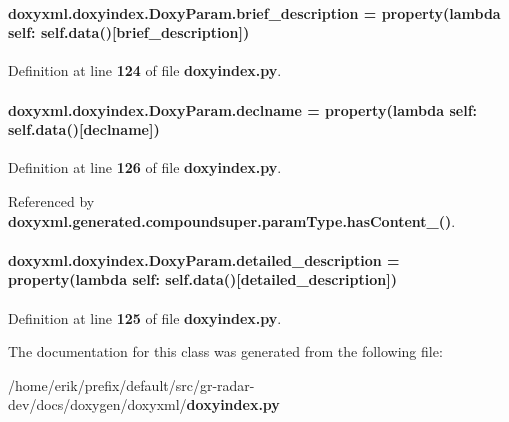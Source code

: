\paragraph[{brief\+\_\+description}]{\setlength{\rightskip}{0pt plus 5cm}doxyxml.\+doxyindex.\+Doxy\+Param.\+brief\+\_\+description = {\bf property}(lambda self\+: {\bf self.\+data}()[\textquotesingle{}brief\+\_\+description\textquotesingle{}])\hspace{0.3cm}{\ttfamily [static]}}\label{classdoxyxml_1_1doxyindex_1_1DoxyParam_ac78e5bace2788f436a82b792c61f61ea}


Definition at line {\bf 124} of file {\bf doxyindex.\+py}.

\paragraph[{declname}]{\setlength{\rightskip}{0pt plus 5cm}doxyxml.\+doxyindex.\+Doxy\+Param.\+declname = {\bf property}(lambda self\+: {\bf self.\+data}()[\textquotesingle{}declname\textquotesingle{}])\hspace{0.3cm}{\ttfamily [static]}}\label{classdoxyxml_1_1doxyindex_1_1DoxyParam_a8cc18ad3d1f38f16c32506b39c1b8eb4}


Definition at line {\bf 126} of file {\bf doxyindex.\+py}.



Referenced by {\bf doxyxml.\+generated.\+compoundsuper.\+param\+Type.\+has\+Content\+\_\+()}.

\paragraph[{detailed\+\_\+description}]{\setlength{\rightskip}{0pt plus 5cm}doxyxml.\+doxyindex.\+Doxy\+Param.\+detailed\+\_\+description = {\bf property}(lambda self\+: {\bf self.\+data}()[\textquotesingle{}detailed\+\_\+description\textquotesingle{}])\hspace{0.3cm}{\ttfamily [static]}}\label{classdoxyxml_1_1doxyindex_1_1DoxyParam_a094a80f2f9412dd1a884e6e6d65f80e8}


Definition at line {\bf 125} of file {\bf doxyindex.\+py}.



The documentation for this class was generated from the following file\+:\begin{DoxyCompactItemize}
\item 
/home/erik/prefix/default/src/gr-\/radar-\/dev/docs/doxygen/doxyxml/{\bf doxyindex.\+py}\end{DoxyCompactItemize}
